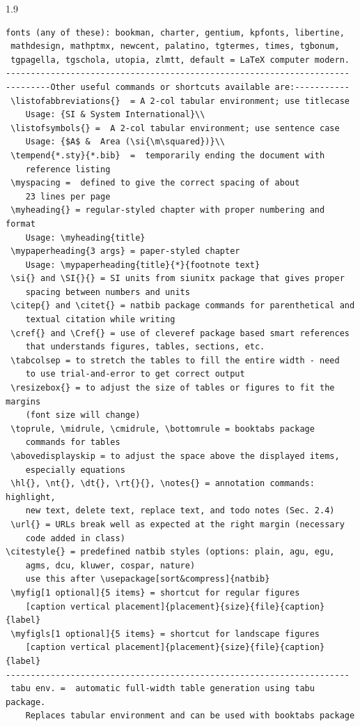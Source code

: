 \documentclass[phd]{ndsu-thesis-2022}
\newcommand\myspacing{1.9}      %
\begin{document}
\begin{spacing}{\myspacing}
\begin{lstlisting}[basicstyle=\ttfamily\footnotesize\color{blue}]
 fonts (any of these): bookman, charter, gentium, kpfonts, libertine, 
 mathdesign, mathptmx, newcent, palatino, tgtermes, times, tgbonum, 
 tgpagella, tgschola, utopia, zlmtt, default = LaTeX computer modern. 
---------------------------------------------------------------------
---------Other useful commands or shortcuts available are:-----------
 \listofabbreviations{}  = A 2-col tabular environment; use titlecase 
 	Usage: {SI & System International}\\
 \listofsymbols{} =  A 2-col tabular environment; use sentence case
 	Usage: {$A$ &  Area (\si{\m\squared})}\\
 \tempend{*.sty}{*.bib}  =  temporarily ending the document with 
 	reference listing
 \myspacing =  defined to give the correct spacing of about 
 	23 lines per page
 \myheading{} = regular-styled chapter with proper numbering and format
 	Usage: \myheading{title}
 \mypaperheading{3 args} = paper-styled chapter 
 	Usage: \mypaperheading{title}{*}{footnote text}
 \si{} and \SI{}{} = SI units from siunitx package that gives proper 
 	spacing between numbers and units
 \citep{} and \citet{} = natbib package commands for parenthetical and 
 	textual citation while writing 
 \cref{} and \Cref{} = use of cleveref package based smart references 
 	that understands figures, tables, sections, etc. 
 \tabcolsep = to stretch the tables to fill the entire width - need
 	to use trial-and-error to get correct output
 \resizebox{} = to adjust the size of tables or figures to fit the margins 
 	(font size will change)
 \toprule, \midrule, \cmidrule, \bottomrule = booktabs package 
 	commands for tables
 \abovedisplayskip = to adjust the space above the displayed items, 
 	especially equations 
 \hl{}, \nt{}, \dt{}, \rt{}{}, \notes{} = annotation commands: highlight, 
 	new text, delete text, replace text, and todo notes (Sec. 2.4)
 \url{} = URLs break well as expected at the right margin (necessary 
 	code added in class)	
\citestyle{} = predefined natbib styles (options: plain, agu, egu, 
	agms, dcu, kluwer, cospar, nature) 
	use this after \usepackage[sort&compress]{natbib}
 \myfig[1 optional]{5 items} = shortcut for regular figures 
 	[caption vertical placement]{placement}{size}{file}{caption}{label}
 \myfigls[1 optional]{5 items} = shortcut for landscape figures 
 	[caption vertical placement]{placement}{size}{file}{caption}{label}	
---------------------------------------------------------------------
 tabu env. =  automatic full-width table generation using tabu package. 
 	Replaces tabular environment and can be used with booktabs package

\end{lstlisting}
\end{spacing}
\end{document}
